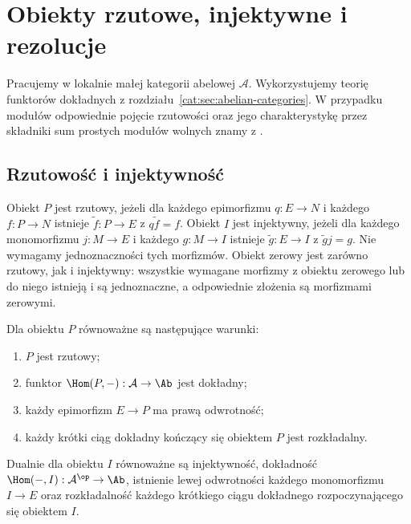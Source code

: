 \section{Obiekty rzutowe, injektywne i rezolucje}\label{cat:sec:projective-injective}
Pracujemy w lokalnie małej kategorii abelowej $\mathcal A$. Wykorzystujemy teorię funktorów dokładnych z rozdziału~\ref{cat:sec:abelian-categories}. W przypadku modułów odpowiednie pojęcie rzutowości oraz jego charakterystykę przez składniki sum prostych modułów wolnych znamy z .

\subsection{Rzutowość i injektywność}
\begin{definicja}\label{cat:def:projective-injective}
Obiekt $P$ jest rzutowy, jeżeli dla każdego epimorfizmu $q:E\to N$ i każdego $f:P\to N$ istnieje $\widetilde f:P\to E$ z $q\widetilde f=f$.
Obiekt $I$ jest injektywny, jeżeli dla każdego monomorfizmu $j:M\to E$ i każdego $g:M\to I$ istnieje $\widetilde g:E\to I$ z $\widetilde g j=g$. Nie wymagamy jednoznaczności tych morfizmów. Obiekt zerowy jest zarówno rzutowy, jak i injektywny: wszystkie wymagane morfizmy z obiektu zerowego lub do niego istnieją i są jednoznaczne, a odpowiednie złożenia są morfizmami zerowymi.
\begin{center}
\end{center}
\end{definicja}
\begin{twierdzenie}\label{cat:thm:projective-characterization}
Dla obiektu $P$ równoważne są następujące warunki:
\begin{enumerate}
\item $P$ jest rzutowy;
\item funktor $\Hom(P,-):\mathcal A\to\Ab$ jest dokładny;
\item każdy epimorfizm $E\to P$ ma prawą odwrotność;
\item każdy krótki ciąg dokładny kończący się obiektem $P$ jest rozkładalny.
\end{enumerate}
Dualnie dla obiektu $I$ równoważne są injektywność, dokładność $\Hom(-,I):\mathcal A^{\op}\to\Ab$, istnienie lewej odwrotności każdego monomorfizmu $I\to E$ oraz rozkładalność każdego krótkiego ciągu dokładnego rozpoczynającego się obiektem $I$.
\end{twierdzenie}
